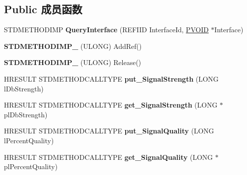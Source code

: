 \subsection*{Public 成员函数}
\begin{DoxyCompactItemize}
\item 
\mbox{\label{class_c_b_d_a_signal_statistics_a281b192954d4026d0210519785e92384}} 
S\+T\+D\+M\+E\+T\+H\+O\+D\+I\+MP {\bfseries Query\+Interface} (R\+E\+F\+I\+ID Interface\+Id, \hyperlink{interfacevoid}{P\+V\+O\+ID} $\ast$Interface)
\item 
\mbox{\label{class_c_b_d_a_signal_statistics_a2a742db866a29b151e90daa3ca711d1e}} 
{\bfseries S\+T\+D\+M\+E\+T\+H\+O\+D\+I\+M\+P\+\_\+} (U\+L\+O\+NG) Add\+Ref()
\item 
\mbox{\label{class_c_b_d_a_signal_statistics_a5c8fef7763e02b4e4e0387db0712bdaa}} 
{\bfseries S\+T\+D\+M\+E\+T\+H\+O\+D\+I\+M\+P\+\_\+} (U\+L\+O\+NG) Release()
\item 
\mbox{\label{class_c_b_d_a_signal_statistics_a45647f39b79785cf31f7b2df384c12cb}} 
H\+R\+E\+S\+U\+LT S\+T\+D\+M\+E\+T\+H\+O\+D\+C\+A\+L\+L\+T\+Y\+PE {\bfseries put\+\_\+\+Signal\+Strength} (L\+O\+NG l\+Db\+Strength)
\item 
\mbox{\label{class_c_b_d_a_signal_statistics_ad0b1b9fd2da05fe99793d90390c4d53b}} 
H\+R\+E\+S\+U\+LT S\+T\+D\+M\+E\+T\+H\+O\+D\+C\+A\+L\+L\+T\+Y\+PE {\bfseries get\+\_\+\+Signal\+Strength} (L\+O\+NG $\ast$pl\+Db\+Strength)
\item 
\mbox{\label{class_c_b_d_a_signal_statistics_ae200c14d5b38f0cb2d79844fd3aec58d}} 
H\+R\+E\+S\+U\+LT S\+T\+D\+M\+E\+T\+H\+O\+D\+C\+A\+L\+L\+T\+Y\+PE {\bfseries put\+\_\+\+Signal\+Quality} (L\+O\+NG l\+Percent\+Quality)
\item 
\mbox{\label{class_c_b_d_a_signal_statistics_a418f32f4f9db5aa2b0f60805dd8143de}} 
H\+R\+E\+S\+U\+LT S\+T\+D\+M\+E\+T\+H\+O\+D\+C\+A\+L\+L\+T\+Y\+PE {\bfseries get\+\_\+\+Signal\+Quality} (L\+O\+NG $\ast$pl\+Percent\+Quality)
\item 

\end{DoxyCompactItemize}
